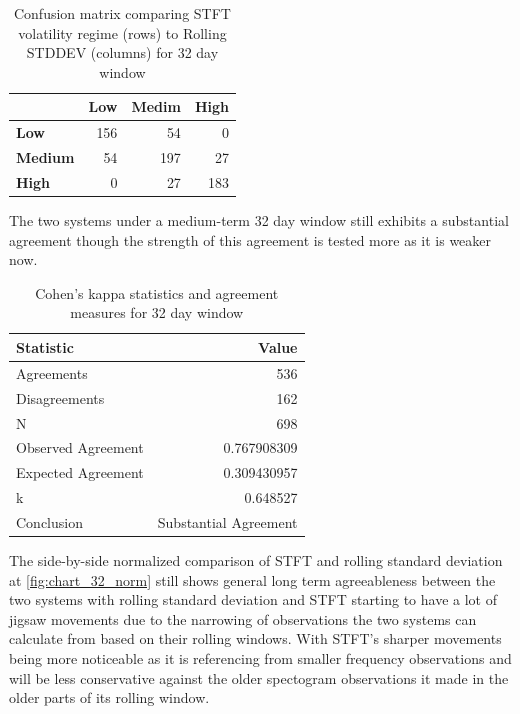 \documentclass[12pt,letterpaper]{article}
\begin{document}
			\begin{table}[htbp]
				\centering
				\caption{Confusion matrix comparing STFT volatility regime (rows) to Rolling STDDEV (columns) for 32 day window}
				\label{tab:confusion_32day}
				\begin{tabular}{@{}l r r r@{}}
					\hline
					& \textbf{Low} & \textbf{Medim} & \textbf{High} \\
					\hline
					\textbf{Low}    & 156 & 54  & 0   \\
					\textbf{Medium} & 54  & 197 & 27  \\
					\textbf{High}   & 0   & 27  & 183 \\
					\hline
				\end{tabular}
			\end{table}
			
			The two systems under a medium-term 32 day window still exhibits a substantial agreement though the strength of this agreement is tested more as it is weaker now.
			
			\begin{table}[htbp]
				\centering
				\caption{Cohen's kappa statistics and agreement measures for 32 day window}
				\label{tab:kappa_32day}
				\begin{tabular}{@{}l r@{}}
					\hline
					\textbf{Statistic} & \textbf{Value} \\
					\hline
					Agreements & 536 \\
					Disagreements & 162 \\
					N & 698 \\
					Observed Agreement & 0.767908309 \\
					Expected Agreement & 0.309430957 \\
					k & 0.648527 \\
					Conclusion & Substantial Agreement \\
					\hline
				\end{tabular}
			\end{table}
			
			The side-by-side normalized comparison of STFT and rolling standard deviation at \ref{fig:chart_32_norm} still shows general long term agreeableness between the two systems with rolling standard deviation and STFT starting to have a lot of jigsaw movements due to the narrowing of observations the two systems can calculate from based on their rolling windows. With STFT's sharper movements being more noticeable as it is referencing from smaller frequency observations and will be less conservative against the older spectogram observations it made in the older parts of its rolling window.
			
\end{document}
